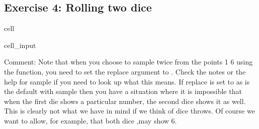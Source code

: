 \documentclass[letterpaper,10pt,english]{jupyterBook}
\begin{document}
\subsection{Exercise 4: Rolling two dice}
\label{\detokenize{exercises_unit_3:exercise-4-rolling-two-dice}}
\begin{sphinxuseclass}{cell}\begin{sphinxVerbatimInput}

\begin{sphinxuseclass}{cell_input}
\begin{sphinxVerbatim}[commandchars=\\\{\}]
\end{sphinxVerbatim}

\end{sphinxuseclass}\end{sphinxVerbatimInput}

\end{sphinxuseclass}
\sphinxAtStartPar
Comment: Note that when you choose to sample twice from the points 1 \sphinxhyphen{} 6 using the 
function, you need to set the replace argument to . Check the notes or the help for
sample if you need to look up what this means. If replace is set to  \sphinxhyphen{} as is the default with sample \sphinxhyphen{} then you have a situation where it is impossible that when the first die shows
a particular number, the second dice shows it as well. This is clearly not what we have in mind
if we think of dice throws. Of course we want to allow, for example, that both dice ,may show 6.
\end{document}
